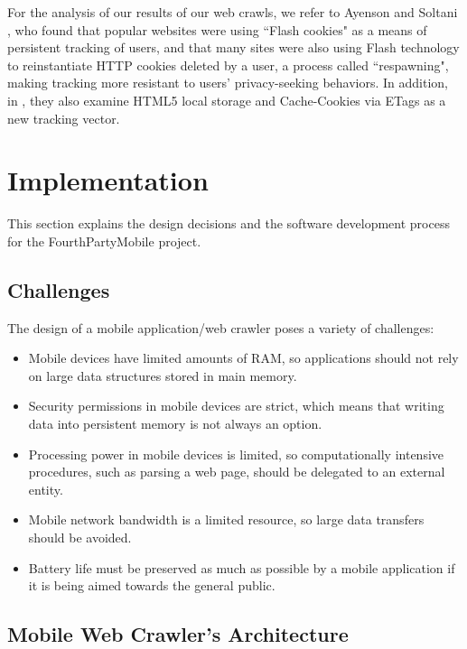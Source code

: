 \documentclass{acm_proc_article-sp}
\begin{document}
For the analysis of our results of our \fpm web crawls, we refer to Ayenson and Soltani \cite{FLASH_COOKIES,soltani}, who found that popular websites were using ``Flash cookies" as a means of persistent tracking of users, and that many sites were also using Flash technology to reinstantiate HTTP cookies deleted by a user, a process called ``respawning", making tracking more resistant to users' privacy-seeking behaviors. In addition, in \cite{FLASH_COOKIES}, they also examine HTML5 local storage and Cache-Cookies via ETags as a new tracking vector.

\section{Implementation}
This section explains the design decisions and the software development process for the FourthPartyMobile project.

\subsection{Challenges}
The design of a mobile application/web crawler poses a variety of challenges:

\begin{itemize}
\item Mobile devices have limited amounts of RAM, so applications should not rely on large data structures stored in main memory.

\item Security permissions in mobile devices are strict, which means that writing data into persistent memory is not always an option.

\item Processing power in mobile devices is limited, so computationally intensive procedures, such as parsing a web page, should be delegated to an external entity.

\item Mobile network bandwidth is a limited resource, so large data transfers should be avoided.

\item Battery life must be preserved as much as possible by a mobile application if it is being aimed towards the general public.
\end{itemize}


\subsection{Mobile Web Crawler's Architecture}
\end{document}
